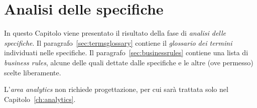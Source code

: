 \chapter{Analisi delle specifiche}
In questo Capitolo viene presentato il risultato della fase di {\it analisi delle specifiche}. Il
paragrafo~\vref{sec:termsglossary} contiene il {\it glossario dei termini} individuati
nelle specifiche. %
Il paragrafo~\vref{sec:businessrules} contiene una lista di {\it business rules},
alcune delle quali dettate dalle specifiche e le altre (ove permesso) scelte liberamente.

L'{\it area analytics} non richiede progettazione, per cui sarà trattata solo nel Capitolo~\vref{ch:analytics}.

%

